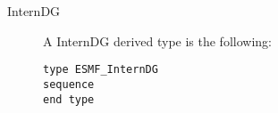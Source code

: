 

\begin{description}

\item [InternDG] A InternDG derived type is the following:
\begin{verbatim}
type ESMF_InternDG
sequence
end type
\end{verbatim}


\end{description}



